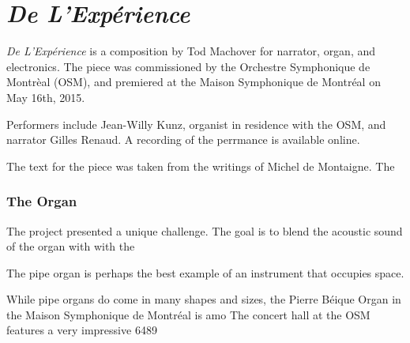 \clearpage
\chapter{\textit{De L'Exp\'{e}rience}}
\label{ch:of-experience}

\textit{De L'Exp\'{e}rience} is a composition by Tod Machover for
narrator, organ, and electronics. The piece was commissioned by the
Orchestre Symphonique de Montr\`{e}al (OSM), and premiered at the
Maison Symphonique de Montr\'{e}al on May 16th, 2015. 



Performers include Jean-Willy Kunz, organist in residence with the
OSM, and narrator Gilles Renaud. A recording of the perrmance is
available
online.

The text for the piece was taken from the writings of
Michel de Montaigne. The

\subsection{The Organ}
\label{sec:organ}
The project presented a unique challenge. The goal is to blend the
acoustic sound of the organ with with the 


The pipe organ is perhaps the best example of an instrument that
occupies space.

While pipe organs do come in many shapes and sizes,
the Pierre B\'{e}ique Organ in the Maison Symphonique de Montr\'{e}al
is amo
The concert hall at the OSM features a very impressive 
6489


